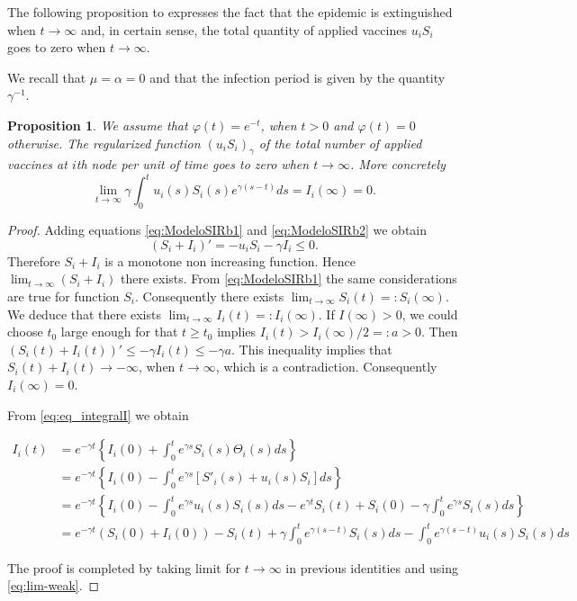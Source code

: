 \documentclass[a4paper,10pt]{article}
\newtheorem{prop}[thm]{Proposition}
\theoremstyle{remark}
\begin{document}
The following proposition to expresses the fact that  the  epidemic is extinguished when $t\to\infty$ and, in certain sense, the total quantity of applied vaccines $ u_iS_i$ goes to zero when $t\to\infty$. 

We recall that $\mu=\alpha=0$ and that  the infection period is given by the quantity $\gamma^{-1}$.   

\begin{prop} We assume that $\varphi(t)=e^{-t}$, when $t>0$ and $\varphi(t)=0$ otherwise. The regularized function $(u_iS_i)_\gamma$  of the total number of applied vaccines at $i$th node  per unit of time goes to zero when $t\to\infty$. More concretely
\[
 \lim\limits_{t\to\infty}\gamma\int_0^t  u_i(s)S_i(s)
  e^{\gamma (s-t)}ds=I_i(\infty)=0.
\]

 
\end{prop}

\begin{proof} Adding equations \eqref{eq:ModeloSIRb1} and \eqref{eq:ModeloSIRb2} we obtain 
\[
 (S_i+I_i)'=- u_iS_i-\gamma I_i\leq 0.
\]
Therefore  $S_i+I_i$ is a monotone non increasing function. Hence $\lim_{t\to\infty} (S_i+I_i)$ there exists. From \eqref{eq:ModeloSIRb1} the same considerations are true for function $S_i$. Consequently there exists $\lim_{t\to\infty} S_i(t)=:S_i(\infty)$. We deduce that there exists  $\lim_{t\to\infty} I_i(t)=:I_i(\infty)$. If $I(\infty)>0$, we could choose $t_0$ large enough for that $t\geq t_0$ implies $I_i(t)>I_i(\infty)/2=:a>0$. Then $(S_i(t)+I_i(t))'\leq -\gamma I_i(t)\leq -\gamma a$. This inequality implies that $S_i(t) +I_i(t)\to -\infty$, when $t\to\infty$, which is a contradiction. Consequently $I_i(\infty)=0$. 

 
From  \eqref{eq:eq_integralI} we obtain 


\[
\begin{split}
 I_i(t)&=e^{-\gamma t}
 \left\{
    I_i(0)+\int_0^t e^{\gamma s} S_{i}(s) \Theta_i(s)ds
\right\}\\
&= e^{-\gamma t}
 \left\{
    I_i(0)-\int_0^t e^{\gamma s} \left[S'_i(s)+ u_i(s)S_i\right]ds 
  \right\}\\
  &= e^{-\gamma t}
 \left\{
    I_i(0)-\int_0^t e^{\gamma s}   u_i(s)S_i(s)ds
    -e^{\gamma t}S_i(t)+S_i(0)-\gamma\int_0^t e^{\gamma s} S_{i}(s) ds 
  \right\}\\
   &= e^{-\gamma t}\left(S_i(0)+ I_i(0)  \right)-S_i(t)
   +\gamma \int_0^t e^{\gamma (s-t)}S_{i}(s)ds-\int_0^t e^{\gamma (s-t)}   u_i(s)S_i(s)ds
 \end{split}
\]

The proof is completed by taking limit for $t\to\infty$ in previous identities and using \eqref{eq:lim-weak}. 
\end{proof}
\end{document}
